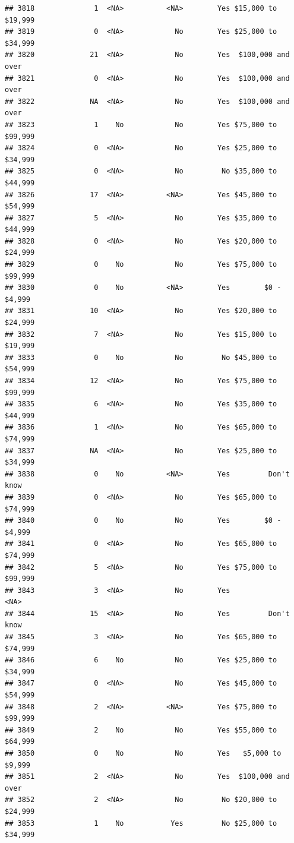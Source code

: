 \documentclass[man]{apa6}
\begin{document}
\begin{verbatim}
## 3818              1  <NA>          <NA>        Yes $15,000 to $19,999
## 3819              0  <NA>            No        Yes $25,000 to $34,999
## 3820             21  <NA>            No        Yes  $100,000 and over
## 3821              0  <NA>            No        Yes  $100,000 and over
## 3822             NA  <NA>            No        Yes  $100,000 and over
## 3823              1    No            No        Yes $75,000 to $99,999
## 3824              0  <NA>            No        Yes $25,000 to $34,999
## 3825              0  <NA>            No         No $35,000 to $44,999
## 3826             17  <NA>          <NA>        Yes $45,000 to $54,999
## 3827              5  <NA>            No        Yes $35,000 to $44,999
## 3828              0  <NA>            No        Yes $20,000 to $24,999
## 3829              0    No            No        Yes $75,000 to $99,999
## 3830              0    No          <NA>        Yes        $0 - $4,999
## 3831             10  <NA>            No        Yes $20,000 to $24,999
## 3832              7  <NA>            No        Yes $15,000 to $19,999
## 3833              0    No            No         No $45,000 to $54,999
## 3834             12  <NA>            No        Yes $75,000 to $99,999
## 3835              6  <NA>            No        Yes $35,000 to $44,999
## 3836              1  <NA>            No        Yes $65,000 to $74,999
## 3837             NA  <NA>            No        Yes $25,000 to $34,999
## 3838              0    No          <NA>        Yes         Don't know
## 3839              0  <NA>            No        Yes $65,000 to $74,999
## 3840              0    No            No        Yes        $0 - $4,999
## 3841              0  <NA>            No        Yes $65,000 to $74,999
## 3842              5  <NA>            No        Yes $75,000 to $99,999
## 3843              3  <NA>            No        Yes               <NA>
## 3844             15  <NA>            No        Yes         Don't know
## 3845              3  <NA>            No        Yes $65,000 to $74,999
## 3846              6    No            No        Yes $25,000 to $34,999
## 3847              0  <NA>            No        Yes $45,000 to $54,999
## 3848              2  <NA>          <NA>        Yes $75,000 to $99,999
## 3849              2    No            No        Yes $55,000 to $64,999
## 3850              0    No            No        Yes   $5,000 to $9,999
## 3851              2  <NA>            No        Yes  $100,000 and over
## 3852              2  <NA>            No         No $20,000 to $24,999
## 3853              1    No           Yes         No $25,000 to $34,999

\end{verbatim}
\end{document}
